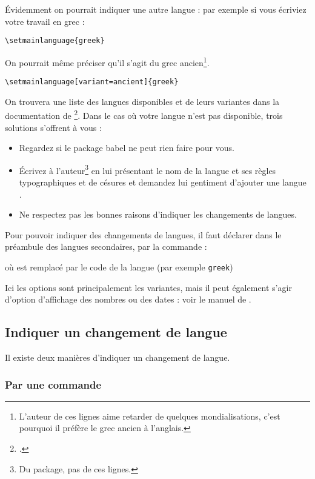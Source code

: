 Évidemment on pourrait indiquer une autre langue :  par exemple si vous écriviez votre travail en grec :

\begin{verbatim}
\setmainlanguage{greek}
\end{verbatim}

On pourrait même préciser qu'il s'agit du grec ancien\footnote{L'auteur de ces lignes aime retarder de quelques mondialisations, c'est pourquoi il préfère le grec ancien à l'anglais.}.

\begin{verbatim}
\setmainlanguage[variant=ancient]{greek}
\end{verbatim}


On trouvera une liste des langues disponibles et de leurs variantes dans la documentation de \footcite{polyglossia}. Dans le cas où votre langue n'est pas disponible, trois solutions s'offrent à vous :
\begin{itemize}
\item Regardez si le package babel ne peut rien faire pour vous. 
\item Écrivez à l'auteur\footnote{Du package, pas de ces lignes.} en lui présentant le nom de la langue et ses règles typographiques et de césures et demandez lui gentiment d'ajouter une langue .
\item Ne respectez pas les bonnes raisons d'indiquer les changements de langues.
\end{itemize}

Pour pouvoir indiquer des changements de langues, il faut déclarer dans le préambule des langues secondaires, par la commande : 


où  est remplacé par le code de la langue (par exemple \verb|greek|)

Ici les options sont principalement les variantes, mais il peut également s'agir d'option d'affichage des nombres ou des dates : voir le manuel de .

\subsection{Indiquer un changement de langue}

Il existe deux manières d'indiquer un changement de langue.

\subsubsection{Par une commande}

